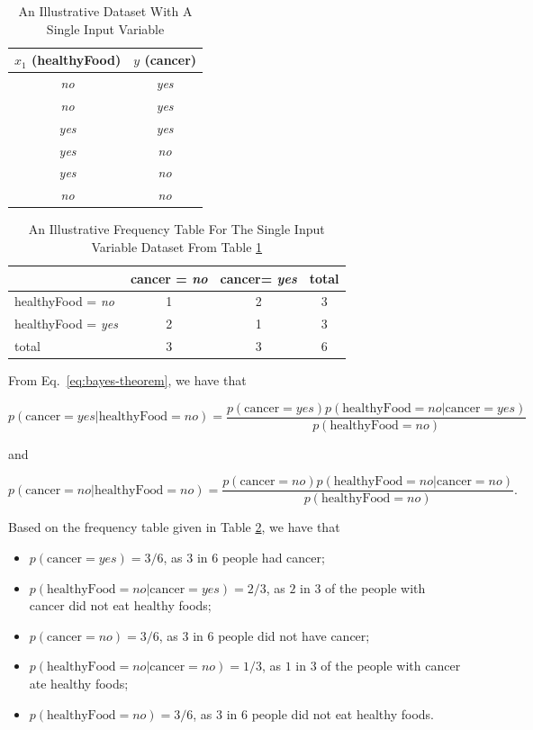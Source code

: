 \begin{table}[ht]
\centering
\caption{An Illustrative Dataset With A Single Input Variable} \label{tab:dataset-single-input}
\begin{tabular}{|c||c|} \hline
$x_1$ (healthyFood) & $y$ (cancer) \\ \hline
\textit{no} & \textit{yes} \\
\textit{no} & \textit{yes} \\
\textit{yes} & \textit{yes} \\
\textit{yes} & \textit{no} \\
\textit{yes} & \textit{no} \\
\textit{no} & \textit{no} \\ \hline
\end{tabular}
\end{table}

\begin{table}[ht]
\centering
\caption{An Illustrative Frequency Table For The Single Input Variable Dataset From Table \ref{tab:dataset-single-input}} \label{tab:frequency-single-input}
\begin{tabular}{|l|c|c|c|} \hline
 & cancer = \textit{no} & cancer= \textit{yes} & total \\ \hline
healthyFood = \textit{no} & 1 & 2 & 3 \\ \hline
healthyFood = \textit{yes} & 2 & 1 & 3 \\ \hline
total & 3 & 3 & 6 \\ \hline
\end{tabular}
\end{table}

From Eq.~\ref{eq:bayes-theorem}, we have that

\[ p(\text{cancer}=\textit{yes}|\text{healthyFood} = \textit{no}) = 
\frac{p(\text{cancer}=\textit{yes}) p(\text{healthyFood} = \textit{no}|\text{cancer}=\textit{yes})}{p(\text{healthyFood} = \textit{no})} \]

and

\[p(\text{cancer}=\textit{no}|\text{healthyFood} = \textit{no}) =
\frac{p(\text{cancer}=\textit{no}) p(\text{healthyFood} = \textit{no}|\text{cancer}=\textit{no})}{p(\text{healthyFood} = \textit{no})} .\]

\vspace{1cm}
Based on the frequency table given in Table \ref{tab:frequency-single-input}, we have that

\begin{itemize}
\item $p(\text{cancer}=\textit{yes}) = 3/6$, as $3$ in $6$ people had cancer;
\item $p(\text{healthyFood} = \textit{no}|\text{cancer}=\textit{yes}) = 2/3$, as $2$ in $3$ of the people with cancer did not eat healthy foods;
\item $p(\text{cancer}=\textit{no}) = 3/6$, as $3$ in $6$ people did not have cancer;
\item $p(\text{healthyFood} = \textit{no}|\text{cancer}=\textit{no}) = 1/3$, as $1$ in $3$ of the people with cancer ate healthy foods;
\item $p(\text{healthyFood} = \textit{no}) = 3/6$, as $3$ in $6$ people did not eat healthy foods.
\end{itemize}

